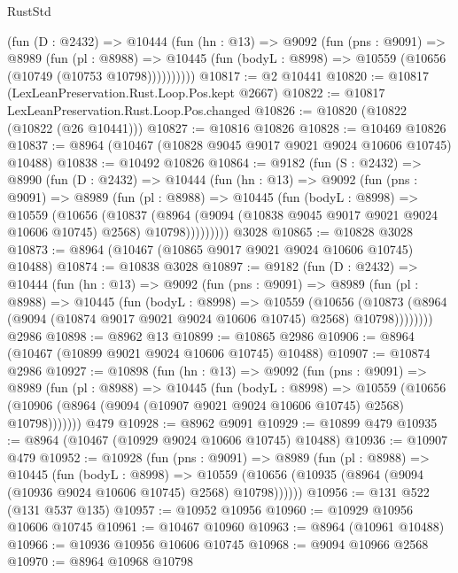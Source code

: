 \begin{lexlean}{RustStd}
\begin{coremodule}
        (fun (D : @2432) =>
        @10444
          (fun (hn : @13) =>
          @9092
            (fun (pns : @9091) =>
            @8989
              (fun (pl : @8988) =>
              @10445 (fun (bodyL : @8998) => @10559 (@10656 (@10749 (@10753 @10798))))))))))
@10817 := @2 @10441
@10820 := @10817 (LexLeanPreservation.Rust.Loop.Pos.kept @2667)
@10822 := @10817 LexLeanPreservation.Rust.Loop.Pos.changed
@10826 := @10820 (@10822 (@10822 (@26 @10441)))
@10827 := @10816 @10826
@10828 := @10469 @10826
@10837 := @8964 (@10467 (@10828 @9045 @9017 @9021 @9024 @10606 @10745) @10488)
@10838 := @10492 @10826
@10864 := @9182
    (fun (S : @2432) =>
    @8990
      (fun (D : @2432) =>
      @10444
        (fun (hn : @13) =>
        @9092
          (fun (pns : @9091) =>
          @8989
            (fun (pl : @8988) =>
            @10445
              (fun (bodyL : @8998) =>
              @10559
                (@10656
                  (@10837
                    (@8964
                      (@9094 (@10838 @9045 @9017 @9021 @9024 @10606 @10745) @2568)
                      @10798)))))))))
    @3028
@10865 := @10828 @3028
@10873 := @8964 (@10467 (@10865 @9017 @9021 @9024 @10606 @10745) @10488)
@10874 := @10838 @3028
@10897 := @9182
    (fun (D : @2432) =>
    @10444
      (fun (hn : @13) =>
      @9092
        (fun (pns : @9091) =>
        @8989
          (fun (pl : @8988) =>
          @10445
            (fun (bodyL : @8998) =>
            @10559
              (@10656
                (@10873 (@8964 (@9094 (@10874 @9017 @9021 @9024 @10606 @10745) @2568) @10798))))))))
    @2986
@10898 := @8962 @13
@10899 := @10865 @2986
@10906 := @8964 (@10467 (@10899 @9021 @9024 @10606 @10745) @10488)
@10907 := @10874 @2986
@10927 := @10898
    (fun (hn : @13) =>
    @9092
      (fun (pns : @9091) =>
      @8989
        (fun (pl : @8988) =>
        @10445
          (fun (bodyL : @8998) =>
          @10559
            (@10656 (@10906 (@8964 (@9094 (@10907 @9021 @9024 @10606 @10745) @2568) @10798)))))))
    @479
@10928 := @8962 @9091
@10929 := @10899 @479
@10935 := @8964 (@10467 (@10929 @9024 @10606 @10745) @10488)
@10936 := @10907 @479
@10952 := @10928
    (fun (pns : @9091) =>
    @8989
      (fun (pl : @8988) =>
      @10445
        (fun (bodyL : @8998) =>
        @10559 (@10656 (@10935 (@8964 (@9094 (@10936 @9024 @10606 @10745) @2568) @10798))))))
@10956 := @131 @522 (@131 @537 @135)
@10957 := @10952 @10956
@10960 := @10929 @10956 @10606 @10745
@10961 := @10467 @10960
@10963 := @8964 (@10961 @10488)
@10966 := @10936 @10956 @10606 @10745
@10968 := @9094 @10966 @2568
@10970 := @8964 @10968 @10798

\end{coremodule}
\end{lexlean}
